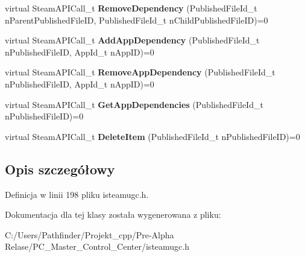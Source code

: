 \begin{DoxyCompactItemize}
virtual Steam\+A\+P\+I\+Call\+\_\+t {\bfseries Remove\+Dependency} (Published\+File\+Id\+\_\+t n\+Parent\+Published\+File\+ID, Published\+File\+Id\+\_\+t n\+Child\+Published\+File\+ID)=0
\item 
\mbox{\label{class_i_steam_u_g_c_a265a93137ad8a866f189766997ac82ee}} 
virtual Steam\+A\+P\+I\+Call\+\_\+t {\bfseries Add\+App\+Dependency} (Published\+File\+Id\+\_\+t n\+Published\+File\+ID, App\+Id\+\_\+t n\+App\+ID)=0
\item 
\mbox{\label{class_i_steam_u_g_c_aadcf38e5ae63e4e122058142c97feec5}} 
virtual Steam\+A\+P\+I\+Call\+\_\+t {\bfseries Remove\+App\+Dependency} (Published\+File\+Id\+\_\+t n\+Published\+File\+ID, App\+Id\+\_\+t n\+App\+ID)=0
\item 
\mbox{\label{class_i_steam_u_g_c_a2cb99cb8be2179f57bd9b47def63be04}} 
virtual Steam\+A\+P\+I\+Call\+\_\+t {\bfseries Get\+App\+Dependencies} (Published\+File\+Id\+\_\+t n\+Published\+File\+ID)=0
\item 
\mbox{\label{class_i_steam_u_g_c_ab789593491c16e6645372903edf87498}} 
virtual Steam\+A\+P\+I\+Call\+\_\+t {\bfseries Delete\+Item} (Published\+File\+Id\+\_\+t n\+Published\+File\+ID)=0
\end{DoxyCompactItemize}


\subsection{Opis szczegółowy}


Definicja w linii 198 pliku isteamugc.\+h.



Dokumentacja dla tej klasy została wygenerowana z pliku\+:\begin{DoxyCompactItemize}
\item 
C\+:/\+Users/\+Pathfinder/\+Projekt\+\_\+cpp/\+Pre-\/\+Alpha Relase/\+P\+C\+\_\+\+Master\+\_\+\+Control\+\_\+\+Center/isteamugc.\+h\end{DoxyCompactItemize}
